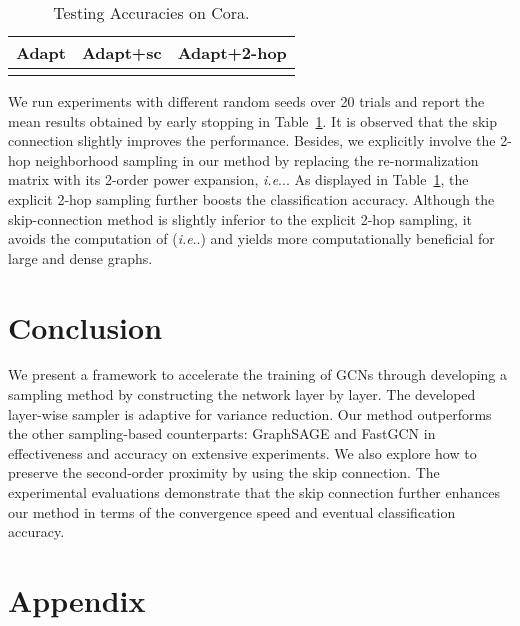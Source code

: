 \documentclass{article}
\makeatletter
\DeclareRobustCommand\onedot{\futurelet\@let@token\@onedot}
\def\@onedot{\ifx\@let@token.\else.\null\fi\xspace}
\def\ie{\emph{i.e}\onedot} \def\Ie{\emph{I.e}\onedot}
\makeatother
\begin{document}
\begin{table}[t!]
\centering
\caption{Testing Accuracies on Cora.}
\label{Tab:sc}
\begin{tabular}{ccc}
\toprule
Adapt                 & Adapt+sc           &   Adapt+2-hop          \\
\hline
     &   &          \\
\bottomrule
\end{tabular}
\end{table}



We run experiments with different random seeds over 20 trials and report the mean results obtained by early stopping in Table~\ref{Tab:sc}. It is observed that the skip connection slightly improves the performance. Besides, we explicitly involve the 2-hop neighborhood sampling in our method by replacing the re-normalization matrix  with its 2-order power expansion, \ie . As displayed in Table~\ref{Tab:sc}, the explicit 2-hop sampling further boosts the classification accuracy. Although the skip-connection method is slightly inferior to the explicit 2-hop sampling, it avoids the computation of (\ie ) and yields more computationally beneficial for large and dense graphs.




\section{Conclusion}
We present a framework to accelerate the training of GCNs through developing a sampling method by constructing the network layer by layer. The developed layer-wise sampler is adaptive for variance reduction. Our method outperforms the other sampling-based counterparts: GraphSAGE and FastGCN in effectiveness and accuracy on extensive experiments. We also explore how to preserve the second-order proximity by using the skip connection. The experimental evaluations demonstrate that the skip connection further enhances our method in terms of the convergence speed and eventual classification accuracy.










\small


\section*{Appendix}
\end{document}
